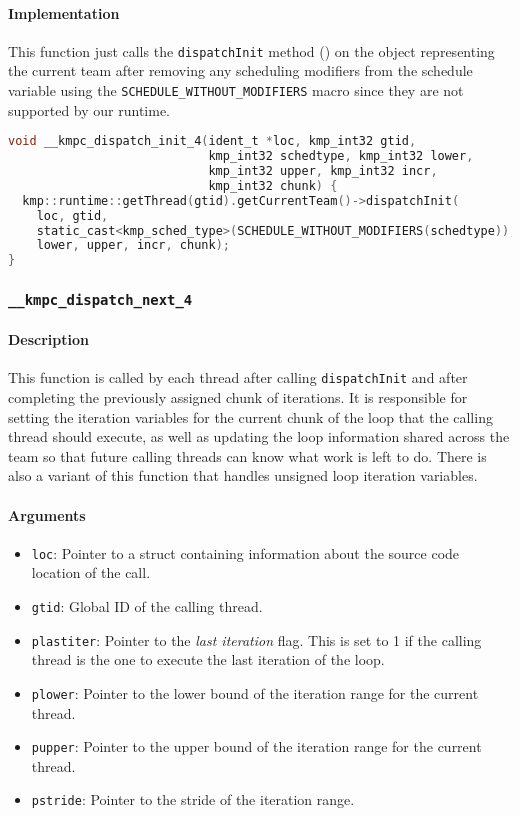 \paragraph{Implementation} This function just calls the \texttt{dispatchInit} method () on
the object representing the current team after removing any scheduling modifiers from the schedule
variable using the \texttt{SCHEDULE\_WITHOUT\_MODIFIERS} macro since they are not supported by our
runtime.

\begin{lstlisting}[language=C, caption={__kmpc_dispatch_init_4},
                   label={lst:kmpc-dispatch-init-4}, escapechar=@]
void __kmpc_dispatch_init_4(ident_t *loc, kmp_int32 gtid,
                            kmp_int32 schedtype, kmp_int32 lower,
                            kmp_int32 upper, kmp_int32 incr,
                            kmp_int32 chunk) {
  kmp::runtime::getThread(gtid).getCurrentTeam()->dispatchInit(
    loc, gtid,
    static_cast<kmp_sched_type>(SCHEDULE_WITHOUT_MODIFIERS(schedtype)),
    lower, upper, incr, chunk);
}
\end{lstlisting}

\subsubsection{\texttt{__kmpc_dispatch_next_4}}
\label{subsubsec:kmpc-dispatch-next-4}

\paragraph{Description} This function is called by each thread after calling \texttt{dispatchInit}
and after completing the previously assigned chunk of iterations. It is responsible for setting the
iteration variables for the current chunk of the loop that the calling thread should execute, as
well as updating the loop information shared across the team so that future calling threads can know
what work is left to do. There is also a variant of this function that handles unsigned loop
iteration variables.

\paragraph{Arguments}
\begin{itemize}
	\item \texttt{loc}: Pointer to a struct containing information about the source code location
	      of the call.
	\item \texttt{gtid}: Global ID of the calling thread.
	\item \texttt{plastiter}: Pointer to the \emph{last iteration} flag. This is set to 1 if the
	      calling thread is the one to execute the last iteration of the loop.
	\item \texttt{plower}: Pointer to the lower bound of the iteration range for the current thread.
	\item \texttt{pupper}: Pointer to the upper bound of the iteration range for the current thread.
	\item \texttt{pstride}: Pointer to the stride of the iteration range.
\end{itemize}

